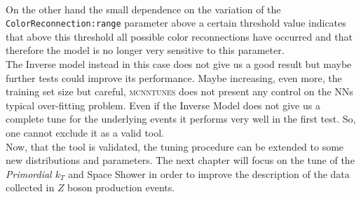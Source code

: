 \\ 
On the other hand the small dependence on the variation of the \texttt{Color}\-\texttt{Reconnection:}\-\texttt{range} parameter above a certain threshold value indicates that above this threshold all possible color reconnections have occurred and that therefore the model is no longer very sensitive to this parameter.   
\\
The Inverse model instead in this case does not give us a good result but maybe further tests could improve its performance. Maybe increasing, even more, the training set size but careful, \textsc{mcnntunes} does not present any control on the NNs typical over-fitting problem. Even if the Inverse Model does not give us a complete tune for the underlying events it performs very well in the first test. So, one cannot exclude it as a valid tool. 
\\
Now, that the tool is validated, the tuning  procedure can be extended to some new distributions and parameters. The next chapter will focus on the tune of the \textit{Primordial $k_T$} and Space Shower in order to improve the description of the data collected in $Z$ boson production events.




